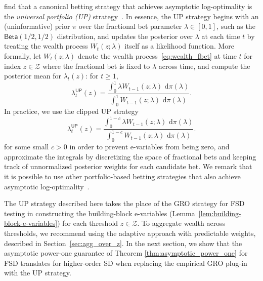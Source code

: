 \documentclass[12pt,twoside]{article}
\theoremstyle{plain}
\theoremstyle{definition}
\theoremstyle{remark}
\newcommand{\calZ}{\mathcal{Z}}
\newcommand{\fbet}{\lambda}  %
\newcommand{\up}{\mathsf{UP}}
\newcommand{\diff}{\,\mathrm{d}}
\begin{document}
\citet{waudbysmith2025universal} find that a canonical betting strategy that achieves asymptotic log-optimality is the \emph{universal portfolio (UP)} strategy~\citep{cover1991universal}. 
In essence, the UP strategy begins with an (uninformative) prior $\pi$ over the fractional bet parameter $\lambda \in [0, 1]$, such as the $\mathsf{Beta}(1/2, 1/2)$ distribution, and updates the posterior over $\lambda$ at each time $t$ by treating the wealth process $W_t(z; \lambda)$ itself as a likelihood function. 
More formally, let $W_t(z; \lambda)$ denote the wealth process~\eqref{eq:wealth_fbet} at time $t$ for index $z \in \calZ$ where the fractional bet is fixed to $\lambda$ across time, and compute the posterior mean for $\lambda_t(z)$: for $t \geq 1$,
\begin{equation*}
    \fbet_t^\up(z) = \frac{\int_0^1 \fbet W_{t-1}(z; \fbet) \, \diff\pi(\fbet)}{\int_0^1 W_{t-1}(z; \fbet) \, \diff \pi(\fbet)}.
\end{equation*}
In practice, we use the clipped UP strategy 
\begin{equation}\label{eq:universal_portfolio}
    \fbet_t^\up(z) = \frac{\int_0^{1-c} \fbet W_{t-1}(z; \fbet) \, \diff\pi(\fbet)}{\int_0^{1-c} W_{t-1}(z; \fbet) \, \diff\pi(\fbet)}.
\end{equation}
for some small $c>0$ in order to prevent e-variables from being zero, and approximate the integrals by discretizing the space of fractional bets and keeping track of unnormalized posterior weights for each candidate bet. 
We remark that it is possible to use other portfolio-based betting strategies that also achieve asymptotic log-optimality~\citep[e.g.,][]{cover1996universal,orabona2023tight}. 

The UP strategy described here takes the place of the GRO strategy for FSD testing in constructing the building-block e-variables (Lemma~\ref{lem:building-block-e-variables}) for each threshold $z \in \calZ$.
To aggregate wealth across thresholds, we recommend using the adaptive approach with predictable weights, described in Section~\ref{sec:agg_over_z}.  
In the next section, we show that the asymptotic power-one guarantee of Theorem \ref{thm:asymptotic_power_one} for FSD translates for higher-order SD when replacing the empirical GRO plug-in with the UP strategy.  
\end{document}
